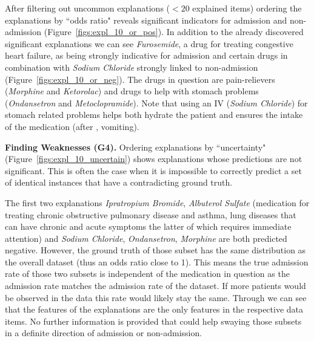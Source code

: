 After filtering out uncommon explanations ($< 20$ explained items) ordering the explanations by ``odds ratio" reveals significant indicators for admission and non-admission (Figure~\ref{figs:expl_10_or_pos}).
In addition to the already discovered significant explanations we can see \emph{Furosemide}, a drug for treating congestive heart failure, as being strongly indicative for admission and certain drugs in combination with \emph{Sodium Chloride} strongly linked to non-admission (Figure~\ref{figs:expl_10_or_neg}).
The drugs in question are pain-relievers (\emph{Morphine} and \emph{Ketorolac}) and drugs to help with stomach problems (\emph{Ondansetron} and \emph{Metoclopramide}).
Note that using an IV (\emph{Sodium Chloride}) for stomach related problems helps both hydrate the patient and ensures the intake of the medication (after \eg, vomiting).

\par \noindent \textbf{Finding Weaknesses (G4).}
Ordering explanations by ``uncertainty" (Figure~\ref{figs:expl_10_uncertain}) shows explanations whose predictions are not significant.
This is often the case when it is impossible to correctly predict a set of identical instances that have a contradicting ground truth.

The first two explanations \emph{Ipratropium Bromide}, \emph{Albuterol Sulfate} (medication for treating chronic obstructive pulmonary disease and asthma, lung diseases that can have chronic and acute symptoms the latter of which requires immediate attention) and \emph{Sodium Chloride}, \emph{Ondansetron}, \emph{Morphine} are both predicted negative.
However, the ground truth of those subset has the same distribution as the overall dataset (thus an odds ratio close to 1).
This means the true admission rate of those two subsets is independent of the medication in question as the admission rate matches the admission rate of the dataset.
If more patients would be observed in the data this rate would likely stay the same.
Through \tabC we can see that the features of the explanations are the only features in the respective data items.
No further information is provided that could help swaying those subsets in a definite direction of admission or non-admission.


